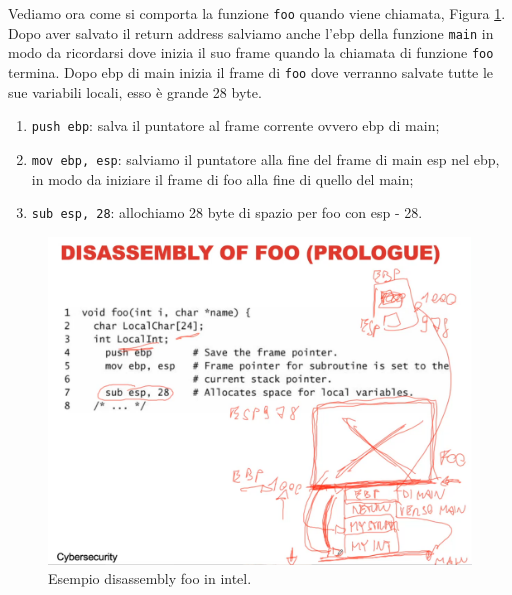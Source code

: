 Vediamo ora come si comporta la funzione \verb|foo| quando viene chiamata, Figura \ref{fig:disass_intel_2}. Dopo aver salvato il return address salviamo anche l'ebp della funzione \verb|main| in modo da ricordarsi dove inizia il suo frame quando la chiamata di funzione \verb|foo| termina. Dopo ebp di main inizia il frame di \verb|foo| dove verranno salvate tutte le sue variabili locali, esso è grande 28 byte. 
\begin{enumerate}
    \item \verb|push ebp|: salva il puntatore al frame corrente ovvero ebp di main;
    \item \verb|mov ebp, esp|: salviamo il puntatore alla fine del frame di main esp nel ebp, in modo da iniziare il frame di foo alla fine di quello del main;
    \item \verb|sub esp, 28|: allochiamo 28 byte di spazio per foo con esp - 28.
\end{enumerate}
\begin{figure}[H]
	\centering
    \includegraphics[width=14cm, keepaspectratio]{santini/img/cap_2/disass_intel_2.png}
	\caption{Esempio disassembly foo in intel.}\label{fig:disass_intel_2}
\end{figure}

